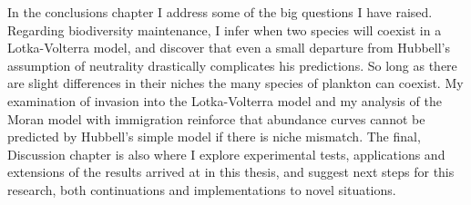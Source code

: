In the conclusions chapter I address some of the big questions I have raised. 
Regarding biodiversity maintenance, I infer when two species will coexist in a Lotka-Volterra model, and discover that even a small departure from Hubbell's assumption of neutrality drastically complicates his predictions. %
So long as there are slight differences in their niches the many species of plankton can coexist. 
My examination of invasion into the Lotka-Volterra model and my analysis of the Moran model with immigration reinforce that abundance curves cannot be predicted by Hubbell's simple model if there is niche mismatch. %
The final, Discussion chapter is also where I explore experimental tests, applications and extensions of the results arrived at in this thesis, and suggest next steps for this research, both continuations and implementations to novel situations. 

